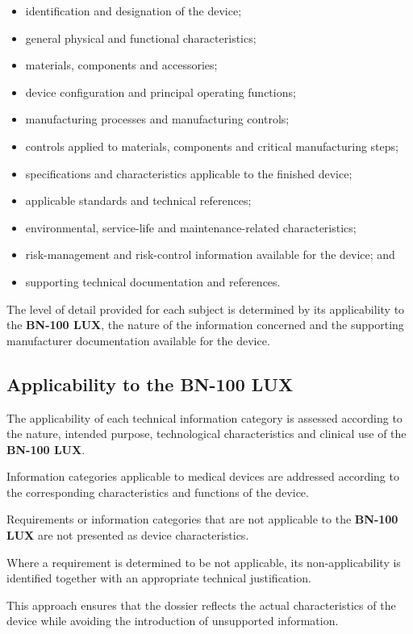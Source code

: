 \begin{itemize}
    \item identification and designation of the device;
    \item general physical and functional characteristics;
    \item materials, components and accessories;
    \item device configuration and principal operating functions;
    \item manufacturing processes and manufacturing controls;
    \item controls applied to materials, components and critical
    manufacturing steps;
    \item specifications and characteristics applicable to the
    finished device;
    \item applicable standards and technical references;
    \item environmental, service-life and maintenance-related
    characteristics;
    \item risk-management and risk-control information available for
    the device; and
    \item supporting technical documentation and references.
\end{itemize}

The level of detail provided for each subject is determined by its
applicability to the \textbf{BN-100 LUX}, the nature of the
information concerned and the supporting manufacturer documentation
available for the device.


\subsection{Applicability to the BN-100 LUX}

The applicability of each technical information category is assessed
according to the nature, intended purpose, technological
characteristics and clinical use of the \textbf{BN-100 LUX}.

Information categories applicable to medical devices are addressed
according to the corresponding characteristics and functions of the
device.

Requirements or information categories that are not applicable to the
\textbf{BN-100 LUX} are not presented as device characteristics.

Where a requirement is determined to be not applicable, its
non-applicability is identified together with an appropriate
technical justification.

This approach ensures that the dossier reflects the actual
characteristics of the device while avoiding the introduction of
unsupported information.

